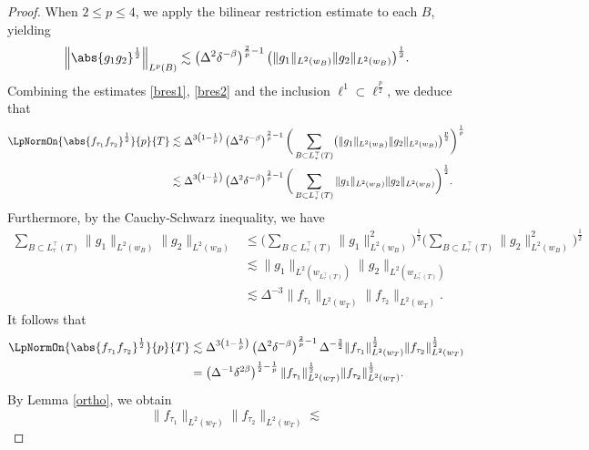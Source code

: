 \documentclass[reqno,centertags,11pt,a4paper]{amsart}
\begin{document}
\begin{proof}
When $2 \le p \le 4$, we apply the bilinear restriction estimate to each $B$, yielding
\begin{equation}\label{bres2}
\Big\|\abs{g_1g_2}^{\frac{1}{2}}\Big\|_{L^p(B)} \lesssim \left(\Delta^2\delta^{-\beta}\right)^{\frac{2}{p} - 1} \bigl(\|g_1\|_{L^2(w_{B})}\|g_2\|_{L^2(w_{B})}\bigr)^{\frac{1}{2}}.
\end{equation}
Combining the estimates \eqref{bres1}, \eqref{bres2} and the inclusion $\ell^1\subset\ell^{\frac{p}{2}}$, we deduce that
\begin{align*}
\LpNormOn{\abs{f_{\tau_1}f_{\tau_2}}^{\frac{1}{2}}}{p}{{T}}
& \lesssim   \Delta^{3\left(1 - \frac{1}{p}\right)} \left(\Delta^2\delta^{-\beta}\right)^{\frac{2}{p} - 1} \bigg(\sum_{B\subset L_\tau^\top(T)} \bigl(\|g_1\|_{L^2(w_{B})}\|g_2\|_{L^2(w_{B})}\bigr)^{\frac{p}{2}} \bigg)^{\frac{1}{p}} \\
& \lesssim   \Delta^{3\left(1 - \frac{1}{p}\right)} \left(\Delta^2\delta^{-\beta}\right)^{\frac{2}{p} - 1} \bigg(\sum_{B\subset L_\tau^\top(T)} \|g_1\|_{L^2(w_{B})}\|g_2\|_{L^2(w_{B})} \bigg)^{\frac{1}{2}}.
\end{align*}
Furthermore, by the Cauchy-Schwarz inequality, we have
\begin{align*}
  \sum_{B\subset L_\tau^\top(T)} \|g_1\|_{L^2(w_{B})}\|g_2\|_{L^2(w_{B})}&\leq
  \bigg(\sum_{B\subset L_\tau^\top(T)} \|g_1\|_{L^2(w_{B})}^2\bigg)^{\frac{1}{2}}\bigg(\sum_{B\subset L_\tau^\top(T)} \|g_2\|_{L^2(w_{B})}^2\bigg)^{\frac{1}{2}}\\
 & \lesssim \|g_1\|_{L^2(w_{L_\tau^\top(T)})}\|g_2\|_{L^2(w_{L_\tau^\top(T)})}\\&\lesssim \Delta^{-3} \|f_{\tau_1}\|_{L^2(w_{T})}\|f_{\tau_2}\|_{L^2(w_{T})}.
\end{align*}
It follows that
\begin{align}\label{bres3}
\nonumber\LpNormOn{\abs{f_{\tau_1}f_{\tau_2}}^{\frac{1}{2}}}{p}{{T}}
 &\lesssim   \Delta^{3\left(1 - \frac{1}{p}\right)} \left(\Delta^2\delta^{-\beta}\right)^{\frac{2}{p} - 1} \Delta^{-\frac{3}{2}} \|f_{\tau_1}\|_{L^2(w_{T})}^{\frac{1}{2}}\|f_{\tau_2}\|_{L^2(w_{T})}^{\frac{1}{2}}\\
 &= \left(\Delta^{-1}\delta^{2\beta}\right)^{\frac{1}{2} - \frac{1}{p}}
          \|f_{\tau_1}\|_{L^2(w_{T})}^{\frac{1}{2}}\|f_{\tau_2}\|_{L^2(w_{T})}^{\frac{1}{2}}.
\end{align}
By Lemma \ref{ortho}, we obtain
\begin{equation}\label{bres4}
     \|f_{\tau_1}\|_{L^2(w_{T})}\|f_{\tau_2}\|_{L^2(w_{T})}\lesssim

\end{equation}
\end{proof}
\end{document}
